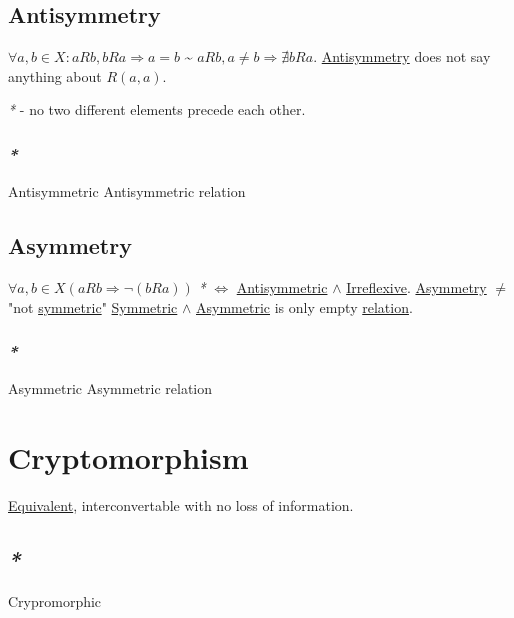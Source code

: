 \documentclass[a4paper,14pt,oneside]{book}
\begin{document}
\section{\label{org03d3161}Antisymmetry}
\label{sec:org24f09a2}

\(\forall a, b \in X : aRb, bRa \Rightarrow a = b\) \textasciitilde{} \(aRb, a \ne b \Rightarrow \nexists bRa\).
\hyperref[org03d3161]{Antisymmetry} does not say anything about \(R(a,a)\).

\emph{*} - no two different elements precede each other.

\subsection{\emph{*}}
\label{sec:orgec9dd2b}

\label{orgd129364}Antisymmetric
\label{org6708d80}Antisymmetric relation

\section{\label{orge5fb95f}Asymmetry}
\label{sec:org3d54e85}

\(\forall a,b \in X (aRb \Rightarrow \neg (bRa))\)
\emph{*} \(\iff\) \hyperref[orgd129364]{Antisymmetric} \(\land\) \hyperref[orgdabd81a]{Irreflexive}.
\hyperref[orge5fb95f]{Asymmetry} \(\ne\) "not \hyperref[org652bcc0]{symmetric}"
\hyperref[org652bcc0]{Symmetric} \(\land\) \hyperref[org6b75387]{Asymmetric} is only empty \hyperref[org1512a6f]{relation}.

\subsection{\emph{*}}
\label{sec:org32e6cc4}

\label{org6b75387}Asymmetric
\label{orga3b8576}Asymmetric relation

\chapter{\label{org3c47ab8}Cryptomorphism}
\label{sec:org1de9de4}

\hyperref[orgd62d669]{Equivalent}, interconvertable with no loss of information.

\section{\emph{*}}
\label{sec:org43d7cdf}

\label{org25442d9}Crypromorphic
\end{document}
